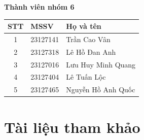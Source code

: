 \documentclass[12pt,a4paper]{article}
\begin{document}
\begin{titlepage}
  \vspace{0.5cm}

  {\Large\bfseries Thành viên nhóm 6}\par
  \vspace{0.2cm}

  \small
  \begin{tabular}{@{}cll@{}}
    \toprule
    \textbf{STT} & \textbf{MSSV} & \textbf{Họ và tên} \\
    \midrule
    1 & 23127141 & Trần Cao Vân \\
    2 & 23127318 & Lê Hồ Đan Anh \\
    3 & 23127016 & Lưu Huy Minh Quang \\
    4 & 23127404 & Lê Tuấn Lộc \\
    5 & 23127465 & Nguyễn Hồ Anh Quốc \\
    \bottomrule
  \end{tabular}\par
  \normalsize

\end{titlepage}

\newpage
\tableofcontents
\newpage










\section{Tài liệu tham khảo}


\end{document}
